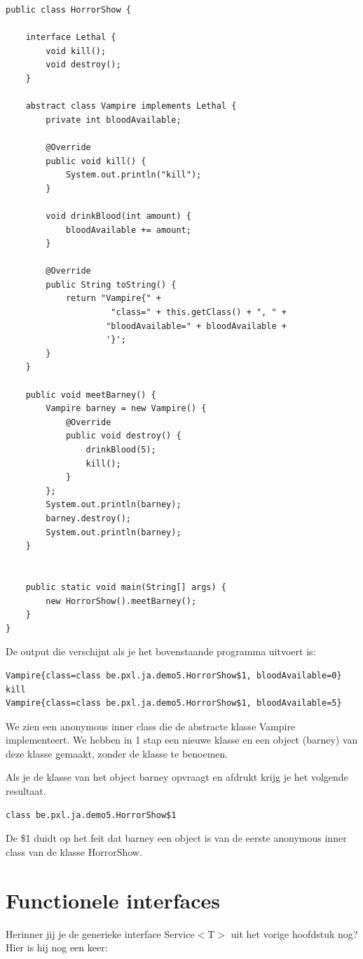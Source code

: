 \documentclass{tstextbook}
\begin{document}
\begin{lstlisting}
public class HorrorShow {

	interface Lethal {
		void kill();
		void destroy();
	}

	abstract class Vampire implements Lethal {
		private int bloodAvailable;

		@Override
		public void kill() {
			System.out.println("kill");
		}

		void drinkBlood(int amount) {
			bloodAvailable += amount;
		}

		@Override
		public String toString() {
			return "Vampire{" +
			         "class=" + this.getClass() + ", " +
					"bloodAvailable=" + bloodAvailable +
					'}';
		}
	}

	public void meetBarney() {
		Vampire barney = new Vampire() {
			@Override
			public void destroy() {
				drinkBlood(5);
				kill();
			}
		};
		System.out.println(barney);
		barney.destroy();
		System.out.println(barney);
	}


	public static void main(String[] args) {
		new HorrorShow().meetBarney();
	}
}
\end{lstlisting}

De output die verschijnt als je het bovenstaande programma uitvoert is:
\begin{verbatim}
Vampire{class=class be.pxl.ja.demo5.HorrorShow$1, bloodAvailable=0}
kill
Vampire{class=class be.pxl.ja.demo5.HorrorShow$1, bloodAvailable=5}
\end{verbatim}

We zien een anonymous inner class die de abstracte klasse Vampire implementeert. We hebben in 1 stap een nieuwe klasse en een object (barney) van deze klasse gemaakt, zonder de klasse te benoemen.

Als je de klasse van het object barney opvraagt en afdrukt krijg je het volgende resultaat.

\begin{verbatim}
class be.pxl.ja.demo5.HorrorShow$1
\end{verbatim}

De \$1 duidt op het feit dat barney een object is van de eerste anonymous inner class van de klasse HorrorShow.

\section{Functionele interfaces}

Herinner jij je de generieke interface Service$<$T$>$ uit het vorige hoofdstuk nog? Hier is hij nog een keer:
\end{document}
